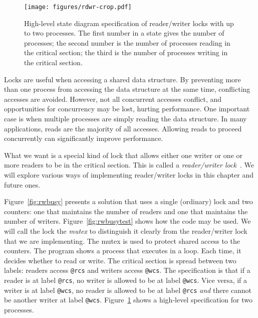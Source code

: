 \documentclass{report}
\begin{document}
\begin{figure}
\begin{center}
\texttt{[image: figures/rdwr-crop.pdf]}
\end{center}
\caption{High-level state diagram specification of reader/writer locks with
up to two processes.
The first number in a state gives the number of processes; the second number is the
number of processes reading in the critical section; the third is the number of
processes writing in the critical section.}
\label{fig:rdwr}
\end{figure}

Locks are useful when accessing a shared data structure.  By preventing
more than one process from accessing the data structure at the same
time, conflicting accesses are avoided.  However, not all concurrent
accesses conflict, and opportunities for concurrency may be lost,
hurting performance.  One important case is when multiple processes
are simply reading the data structure.
In many applications, reads are the majority of all accesses.
Allowing reads to proceed concurrently can significantly improve performance.

What we want is a special kind of lock that allows either one writer
or one or more readers to be in the critical section.  This is called
a \emph{reader/writer lock}~\cite{CHP71}.
We will explore various ways of implementing reader/writer locks in
this chapter and future ones.

Figure~\ref{fig:rwbusy} presents a solution that uses a
single (ordinary) lock and two counters: one that maintains the number
of readers and one that maintains the number of writers.
Figure~\ref{fig:rwbusytest} shows how the code may be used.
We will call the lock the \emph{mutex} to distinguish it clearly from
the reader/writer lock that we are implementing.
The mutex is used to protect shared access to the counters.
The program shows a process that executes in a loop.
Each time, it decides whether to read or write.
The critical section is spread between two labels:
readers access \texttt{@rcs} and writers access \texttt{@wcs}.
The specification is that if a reader is at label \texttt{@rcs},
no writer is allowed to be at label \texttt{@wcs}.  Vice versa, if
a writer is at label \texttt{@wcs}, no reader is allowed to be at
label \texttt{@rcs} \emph{and} there cannot be another writer at
label \texttt{@wcs}.  Figure~\ref{fig:rdwr} shows a high-level
specification for two processes.
\end{document}
